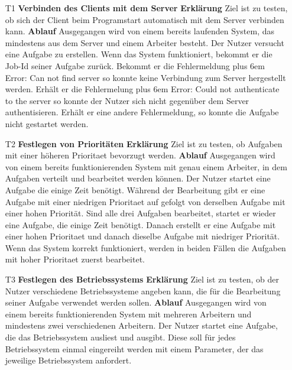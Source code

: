 \documentclass[a4paper,12pt]{article}
\makeatletter
\newenvironment{mycode}
 {\def\@xobeysp{\ }\verbatim\rightskip=0pt plus 6em\relax}
 {\endverbatim}
\makeatother
\begin{document}
\begin{itemize}
\item[T1] \textbf{Verbinden des Clients mit dem Server}
\subitem \textbf{Erklärung} Ziel ist zu testen, ob sich der Client beim Programstart automatisch mit dem Server verbinden kann.
\subitem \textbf{Ablauf} Ausgegangen wird von einem bereits laufenden System, das mindestens aus dem Server und einem Arbeiter besteht.
Der Nutzer versucht eine Aufgabe zu erstellen.
Wenn das System funktioniert, bekommt er die Job-Id seiner Aufgabe zurück.
Bekommt er die Fehlermeldung
\begin{mycode}
Error: Can not find server
\end{mycode}
so konnte keine Verbindung zum Server hergestellt werden. Erhält er die Fehlermelung
\begin{mycode}
Error: Could not authenticate to the server
\end{mycode}
so konnte der Nutzer sich nicht gegenüber dem Server authentisieren. Erhält er eine andere Fehlermeldung, so konnte die Aufgabe nicht gestartet werden.

\item[T2] \textbf{Festlegen von Prioritäten }
\subitem \textbf{Erklärung} Ziel ist zu testen, ob Aufgaben mit einer höheren \gls{Prioritaet} bevorzugt werden.
\subitem \textbf{Ablauf} Ausgegangen wird von einem bereits funktionierenden System mit genau einem Arbeiter, in dem Aufgaben verteilt und bearbeitet werden können.
Der Nutzer startet eine Aufgabe die einige Zeit benötigt. Während der Bearbeitung gibt er eine Aufgabe mit einer niedrigen \gls{Prioritaet} auf gefolgt von derselben Aufgabe mit einer hohen Priorität.
Sind alle drei Aufgaben bearbeitet, startet er wieder eine Aufgabe, die einige Zeit benötigt. Danach erstellt er eine Aufgabe mit einer hohen \gls{Prioritaet} und danach dieselbe Aufgabe mit niedriger Priorität.
Wenn das System korrekt funktioniert, werden in beiden Fällen die Aufgaben mit hoher \gls{Prioritaet} zuerst bearbeitet.

\item[T3] \textbf{Festlegen des Betriebssystems}
\subitem \textbf{Erklärung} Ziel ist zu testen, ob der Nutzer verschiedene Betriebssysteme angeben kann, die für die Bearbeitung seiner Aufgabe verwendet werden sollen.
\subitem \textbf{Ablauf} Ausgegangen wird von einem bereits funktionierenden System mit mehreren Arbeitern und mindestens zwei verschiedenen Arbeitern. Der Nutzer startet eine Aufgabe, die das Betriebssystem ausliest und ausgibt. Diese soll für jedes Betriebssystem einmal eingereiht werden mit einem Parameter, der das jeweilige Betriebssystem anfordert.


\end{itemize}
\end{document}
